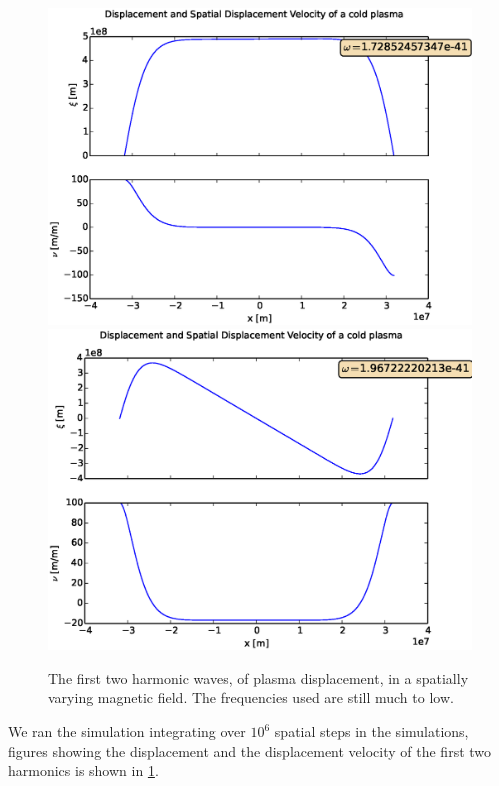 \documentclass[x11names]{article}
\begin{document}
  \begin{figure}
    \includegraphics[width = 0.45\linewidth] {../source/wave172852}
    \includegraphics[width = 0.45\linewidth] {../source/wave196722}
    \caption{The first two harmonic waves, of plasma displacement, in a spatially varying magnetic field. The frequencies used are still much to low.}
    \label{fig:waves}
  \end{figure}

  We ran the simulation integrating over \(10^6\) spatial steps in the simulations, figures showing the displacement and the displacement velocity of the first two harmonics is shown in \cref{fig:waves}.

    
      

\appendix
\end{document}
